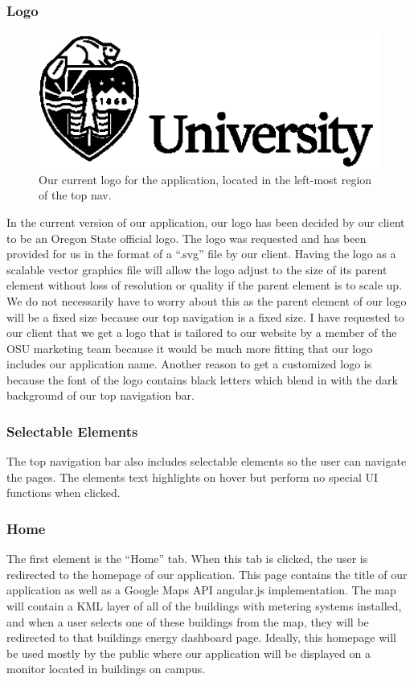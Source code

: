 \documentclass[letterpaper,10pt,serif,draftclsnofoot,onecolumn,compsoc,titlepage]{IEEEtran}
\begin{document}
	\subsubsection{Logo}
    \begin{figure}[H]
      \centering
      \includegraphics[width=17cm]{images/logo.eps}
      \caption{Our current logo for the application, located in the left-most region of the top nav.}
    \end{figure}
  In the current version of our application, our logo has been decided by our client to be an Oregon State official logo. The logo was requested and has been provided for us 
  in the format of a ``.svg'' file by our client. Having the logo as a scalable vector graphics file will allow the logo adjust to the size of its parent element without loss 
  of resolution or quality if the parent element is to scale up. We do not necessarily have to worry about this as the parent element of our logo will be a fixed
  size because our top navigation is a fixed size. I have requested to our client that we get a logo that is tailored to our website by a member of the OSU marketing
  team because it would be much more fitting that our logo includes our application name. Another reason to get a customized logo is because the font of the logo contains
  black letters which blend in with the dark background of our top navigation bar.
		
		\subsubsection{Selectable Elements}
		The top navigation bar also includes selectable elements so the user can navigate the pages. The elements text highlights on hover but perform no special UI functions
		when clicked. 
			\subsubsection{Home}
			The first element is the ``Home'' tab. When this tab is clicked, the user is redirected to the homepage of our application. This page contains the title of our 
			application as well as a Google Maps API angular.js implementation. The map will contain a KML layer of all of the buildings with metering systems installed, and 
			when a user selects one of these buildings from the map, they will be redirected to that buildings energy dashboard page. Ideally, this homepage will be used
			mostly by the public where our application will be displayed on a monitor located in buildings on campus.
\end{document}
